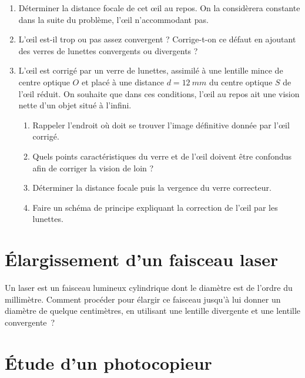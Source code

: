 \documentclass[../../main/main.tex]{subfiles}
\begin{document}
\begin{enumerate}
	\item Déterminer la distance focale de cet œil au repos. On la considèrera
	      constante dans la suite du problème, l'œil n'accommodant pas.
	\item L'œil est-il trop ou pas assez convergent ? Corrige-t-on ce défaut en
	      ajoutant des verres de lunettes convergents ou divergents ?
	\item L'œil est corrigé par un verre de lunettes, assimilé à une lentille
	      mince de centre optique $O$ et
	      placé à une distance $d = \SI{12}{mm}$ du centre optique $S$ de l'œil
	      réduit. On souhaite que dans ces conditions, l'œil au repos ait une
	      vision nette d'un objet situé à l'infini.
	      \begin{enumerate}
		      \item Rappeler l'endroit où doit se trouver l'image définitive
		            donnée par l'œil corrigé.
		      \item Quels points caractéristiques du verre et de l'œil doivent
		            être confondus afin de corriger la vision de loin ?
		      \item Déterminer la distance focale puis la vergence du verre
		            correcteur.
		      \item Faire un schéma de principe expliquant la correction de l'œil
		            par les lunettes.
	      \end{enumerate}
\end{enumerate}

\section{Élargissement d'un faisceau laser}
Un laser est un faisceau lumineux cylindrique dont le diamètre est de l'ordre du
millimètre. Comment procéder pour élargir ce faisceau jusqu'à lui donner un
diamètre de quelque centimètres, en utilisant une lentille divergente et une
lentille convergente~?

\section{Étude d'un photocopieur}
\end{document}
